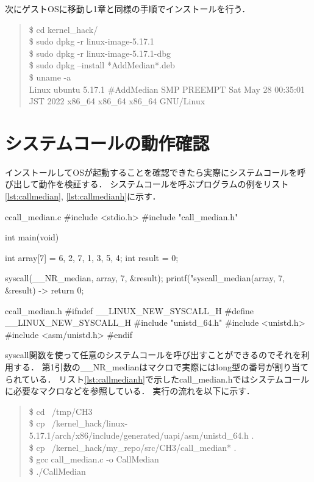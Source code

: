 次にゲストOSに移動し1章と同様の手順でインストールを行う．
\begin{quote}
\$ cd kernel\_hack/ \\
\$ sudo dpkg -r linux-image-5.17.1 \\
\$ sudo dpkg -r linux-image-5.17.1-dbg \\
\$ sudo dpkg --install *AddMedian*.deb \\
\$ uname -a \\
Linux ubuntu 5.17.1 \#AddMedian SMP PREEMPT Sat May 28 00:35:01 JST 2022 x86\_64 x86\_64 x86\_64 GNU/Linux
\end{quote}

\section{システムコールの動作確認}
インストールしてOSが起動することを確認できたら実際にシステムコールを呼び出して動作を検証する．
システムコールを呼ぶプログラムの例をリスト\ref{lst:callmedian}, \ref{lst:callmedianh}に示す．
\begin{longlisting}
\begin{myminted}{c}{call\_median.c}
#include <stdio.h>
#include "call_median.h"

int main(void) {
    int array[7] = {6, 2, 7, 1, 3, 5, 4};
    int result = 0;

    syscall(__NR_median, array, 7, &result);
    printf("syscall_median(array, 7, &result) -> %
    return 0;
}
\end{myminted}
\caption{medianを呼ぶプログラム}
\label{lst:callmedian}
\end{longlisting}

\begin{longlisting}
\begin{myminted}{c}{call\_median.h}
#ifndef __LINUX_NEW_SYSCALL_H
#define __LINUX_NEW_SYSCALL_H
#include "unistd_64.h"
#include <unistd.h>
#include <asm/unistd.h>
#endif
\end{myminted}
\caption{call\_median.h}
\label{lst:callmedianh}
\end{longlisting}

syscall関数を使って任意のシステムコールを呼び出すことができるのでそれを利用する．
第1引数の\_\_NR\_medianはマクロで実際にはlong型の番号が割り当てられている．\cite{unistd32}
リスト\ref{lst:callmedianh}で示したcall\_median.hではシステムコールに必要なマクロなどを参照している．
実行の流れを以下に示す．

\begin{quote}
\$ cd ~/tmp/CH3 \\
\$ cp ~/kernel\_hack/linux-5.17.1/arch/x86/include/generated/uapi/asm/unistd\_64.h . \\
\$ cp ~/kernel\_hack/my\_repo/src/CH3/call\_median* . \\
\$ gcc call\_median.c -o CallMedian \\
\$ ./CallMedian
\end{quote}


